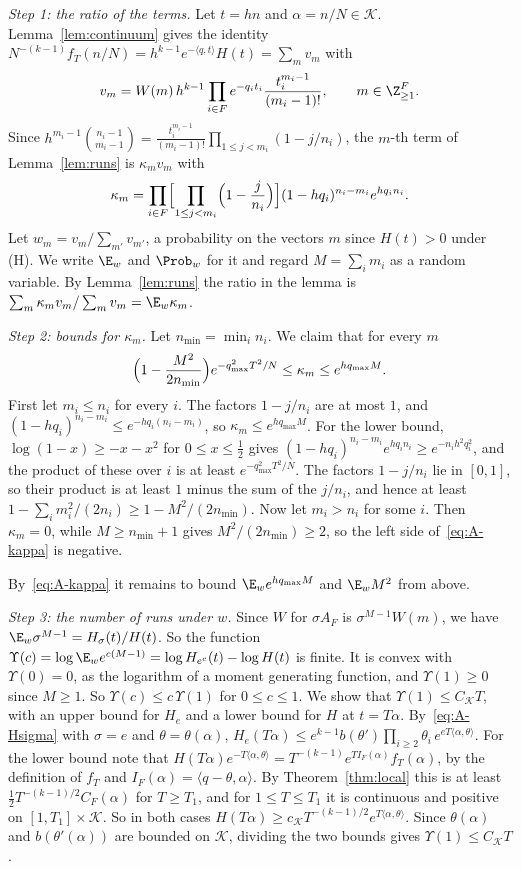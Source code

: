 \emph{Step 1: the ratio of the terms.} Let $t=hn$ and
$\alpha=n/N\in\mathcal K$. Lemma~\ref{lem:continuum} gives the identity
$N^{-(k-1)}f_T(n/N)=h^{k-1}e^{-\langle q,t\rangle}H(t)=\sum_mv_m$ with
\[
v_m=W(m)\,h^{k-1}\prod_{i\in F}e^{-q_it_i}\frac{t_i^{m_i-1}}{(m_i-1)!},
\qquad m\in\Z_{\ge1}^F .
\]
Since $h^{m_i-1}\binom{n_i-1}{m_i-1}=\frac{t_i^{m_i-1}}{(m_i-1)!}
\prod_{1\le j<m_i}(1-j/n_i)$, the $m$-th term of Lemma~\ref{lem:runs} is
$\kappa_mv_m$ with
\[
\kappa_m=\prod_{i\in F}\Bigl[\prod_{1\le j<m_i}\Bigl(1-\frac j{n_i}\Bigr)\Bigr]
(1-hq_i)^{n_i-m_i}e^{hq_in_i}.
\]
Let $w_m=v_m/\sum_{m'}v_{m'}$, a probability on the vectors $m$ since
$H(t)>0$ under (H). We write $\E_w$ and $\Prob_w$ for it and regard
$M=\sum_im_i$ as a random variable. By Lemma~\ref{lem:runs} the ratio in the
lemma is $\sum_m\kappa_mv_m/\sum_mv_m=\E_w\kappa_m$.

\emph{Step 2: bounds for $\kappa_m$.} Let $n_{\min}=\min_in_i$. We claim that
for every $m$
\begin{equation}\label{eq:A-kappa}
\Bigl(1-\frac{M^2}{2n_{\min}}\Bigr)e^{-q_{\max}^2T^2/N}\le\kappa_m\le
e^{hq_{\max}M}.
\end{equation}
First let $m_i\le n_i$ for every $i$. The factors $1-j/n_i$ are at most $1$,
and $(1-hq_i)^{n_i-m_i}\le e^{-hq_i(n_i-m_i)}$, so
$\kappa_m\le e^{hq_{\max}M}$. For the lower bound,
$\log(1-x)\ge-x-x^2$ for $0\le x\le\frac12$ gives
$(1-hq_i)^{n_i-m_i}e^{hq_in_i}\ge e^{-n_ih^2q_i^2}$, and the product of these
over $i$ is at least $e^{-q_{\max}^2T^2/N}$. The factors $1-j/n_i$ lie in
$[0,1]$, so their product is at least $1$ minus the sum of the $j/n_i$, and
hence at least $1-\sum_im_i^2/(2n_i)\ge1-M^2/(2n_{\min})$. Now let
$m_i>n_i$ for some $i$. Then $\kappa_m=0$, while $M\ge n_{\min}+1$ gives
$M^2/(2n_{\min})\ge2$, so the left side of~\eqref{eq:A-kappa} is negative.

By~\eqref{eq:A-kappa} it remains to bound $\E_we^{hq_{\max}M}$ and
$\E_wM^2$ from above.

\emph{Step 3: the number of runs under $w$.} Since $W$ for $\sigma A_F$ is
$\sigma^{M-1}W(m)$, we have $\E_w\sigma^{M-1}=H_\sigma(t)/H(t)$. So the
function $\Upsilon(c)=\log\E_we^{c(M-1)}=\log H_{e^c}(t)-\log H(t)$ is finite. It
is convex with $\Upsilon(0)=0$, as the logarithm of a moment generating function,
and $\Upsilon(1)\ge0$ since $M\ge1$. So $\Upsilon(c)\le c\,\Upsilon(1)$ for $0\le c\le1$.
We show that $\Upsilon(1)\le C_{\mathcal K}T$, with an upper bound for $H_e$ and
a lower bound for $H$ at $t=T\alpha$. By~\eqref{eq:A-Hsigma} with $\sigma=e$
and $\theta=\theta(\alpha)$,
$H_e(T\alpha)\le e^{k-1}b(\theta')\prod_{i\ge2}\theta_i\,
e^{eT\langle\alpha,\theta\rangle}$. For the lower bound note that
$H(T\alpha)e^{-T\langle\alpha,\theta\rangle}=T^{-(k-1)}e^{TI_F(\alpha)}f_T(\alpha)$,
by the definition of $f_T$ and $I_F(\alpha)=\langle q-\theta,\alpha\rangle$.
By Theorem~\ref{thm:local} this is at least
$\frac12T^{-(k-1)/2}C_F(\alpha)$ for $T\ge T_1$, and for $1\le T\le T_1$ it is
continuous and positive on $[1,T_1]\times\mathcal K$. So in both cases
$H(T\alpha)\ge c_{\mathcal K}T^{-(k-1)/2}e^{T\langle\alpha,\theta\rangle}$.
Since $\theta(\alpha)$ and $b(\theta'(\alpha))$ are bounded on $\mathcal K$,
dividing the two bounds gives $\Upsilon(1)\le C_{\mathcal K}T$.

